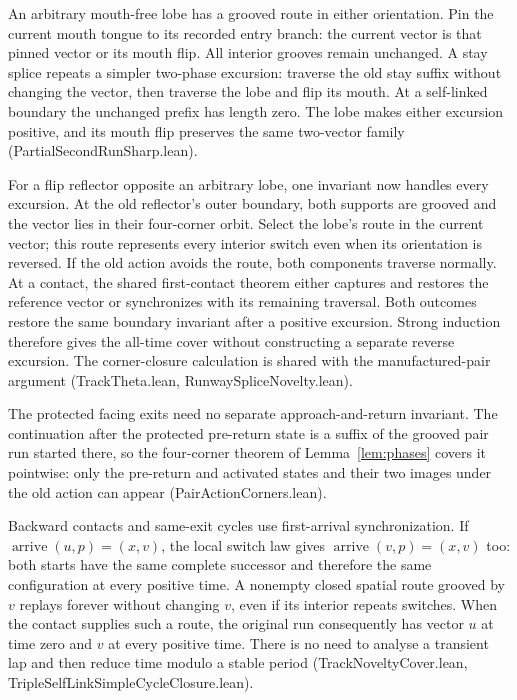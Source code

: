 \documentclass[11pt]{article}
\theoremstyle{definition}
\newcommand{\file}[1]{\textsf{#1}}
\begin{document}
An arbitrary mouth-free lobe has a grooved route in either orientation.
Pin the current mouth tongue to its recorded entry branch: the current
vector is that pinned vector or its mouth flip. All interior grooves remain
unchanged. A stay splice repeats a simpler two-phase excursion: traverse
the old stay suffix without changing the vector, then traverse the lobe
and flip its mouth. At a self-linked boundary the unchanged prefix has
length zero. The lobe makes either excursion positive, and its mouth flip
preserves the same two-vector family
(\file{PartialSecondRunSharp.lean}).

For a flip reflector opposite an arbitrary lobe, one invariant now
handles every excursion. At the old reflector's outer boundary, both
supports are grooved and the vector lies in their four-corner orbit.
Select the lobe's route in the current vector; this route represents every
interior switch even when its orientation is reversed. If the old action
avoids the route, both components traverse normally. At a contact, the
shared first-contact theorem either captures and restores the reference
vector or synchronizes with its remaining traversal. Both outcomes restore
the same boundary invariant after a positive excursion. Strong induction
therefore gives the all-time cover without constructing a separate reverse
excursion. The corner-closure calculation is shared with the manufactured-pair
argument (\file{TrackTheta.lean}, \file{RunwaySpliceNovelty.lean}).

The protected facing exits need no separate approach-and-return invariant.
The continuation after the protected pre-return state is a suffix of the
grooved pair run started there, so the four-corner theorem of
Lemma~\ref{lem:phases} covers it pointwise: only the pre-return and
activated states and their two images under the old action can appear
(\file{PairActionCorners.lean}).

Backward contacts and same-exit cycles use first-arrival synchronization.
If $\operatorname{arrive}(u,p)=(x,v)$, the local switch law gives
$\operatorname{arrive}(v,p)=(x,v)$ too: both starts have the same complete
successor and therefore the same configuration at every positive time. A
nonempty closed spatial route grooved by $v$ replays forever without changing
$v$, even if its interior repeats switches. When the contact supplies such a
route, the original run consequently has vector $u$ at time zero and $v$ at
every positive time. There is no need to analyse a transient lap and then
reduce time modulo a stable period
(\file{TrackNoveltyCover.lean}, \file{TripleSelfLinkSimpleCycleClosure.lean}).
\end{document}
